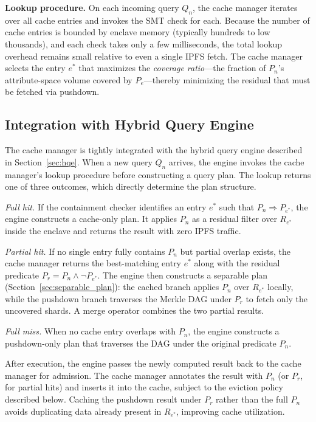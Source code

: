 \textbf{Lookup procedure.}
On each incoming query $Q_n$, the cache manager iterates over all cache entries and invokes the SMT check for each.
Because the number of cache entries is bounded by enclave memory (typically hundreds to low thousands), and each check takes only a few milliseconds, the total lookup overhead remains small relative to even a single IPFS fetch.
The cache manager selects the entry $e^*$ that maximizes the \emph{coverage ratio}---the fraction of $P_n$'s attribute-space volume covered by $P_e$---thereby minimizing the residual that must be fetched via pushdown.

\subsection{Integration with Hybrid Query Engine}
\label{sec:containment_reuse}

The cache manager is tightly integrated with the hybrid query engine described in Section~\ref{sec:hqe}.
When a new query $Q_n$ arrives, the engine invokes the cache manager's lookup procedure before constructing a query plan.
The lookup returns one of three outcomes, which directly determine the plan structure.

\emph{Full hit.}
If the containment checker identifies an entry $e^*$ such that $P_n \Rightarrow P_{e^*}$, the engine constructs a cache-only plan.
It applies $P_n$ as a residual filter over $R_{e^*}$ inside the enclave and returns the result with zero IPFS traffic.

\emph{Partial hit.}
If no single entry fully contains $P_n$ but partial overlap exists, the cache manager returns the best-matching entry $e^*$ along with the residual predicate $P_r = P_n \wedge \neg P_{e^*}$.
The engine then constructs a separable plan (Section~\ref{sec:separable_plan}): the cached branch applies $P_n$ over $R_{e^*}$ locally, while the pushdown branch traverses the Merkle DAG under $P_r$ to fetch only the uncovered shards.
A merge operator combines the two partial results.

\emph{Full miss.}
When no cache entry overlaps with $P_n$, the engine constructs a pushdown-only plan that traverses the DAG under the original predicate $P_n$.

After execution, the engine passes the newly computed result back to the cache manager for admission.
The cache manager annotates the result with $P_n$ (or $P_r$, for partial hits) and inserts it into the cache, subject to the eviction policy described below.
Caching the pushdown result under $P_r$ rather than the full $P_n$ avoids duplicating data already present in $R_{e^*}$, improving cache utilization.

